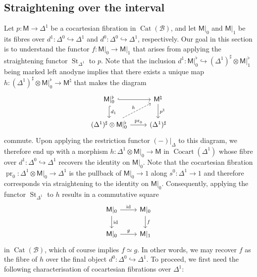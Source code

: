 \documentclass[reqno]{amsart}
\numberwithin{equation}{subsection}
\theoremstyle{plain}
\theoremstyle{definition}
\let\scr=\mathcal
\let\into=\hookrightarrow
\def\BB{\scr B}
\DeclareMathOperator{\id}{id}
\DeclareMathOperator{\Cat}{Cat}
\DeclareMathOperator{\Cocart}{Cocart}
\DeclareMathOperator{\pr}{pr}
\DeclareMathOperator{\St}{St}
\newcommand{\I}[1]{\mathsf{#1}}
\begin{document}
\subsection{Straightening over the interval}
\label{sec:straighteningInterval}
Let $p\colon \I{M}\to\Delta^1$ be a cocartesian fibration in $\Cat(\BB)$, and let $\I{M}\vert_0$ and $\I{M}\vert_1$ be its fibres over $d^1\colon\Delta^0\into\Delta^1$ and $d^0\colon\Delta^0\into\Delta^1$, respectively. Our goal in this section is to understand the functor $f\colon\I{M}\vert_0\to\I{M}\vert_1$ that arises from applying the straightening functor $\St_{\Delta^1}$ to $p$. Note that the inclusion $d^1\colon \I{M}\vert_0^\flat\into(\Delta^1)^\sharp\otimes\I{M}\vert_1^\flat$ being marked left anodyne implies that there exists a unique map $h\colon(\Delta^1)^\sharp\otimes\I{M}\vert_0^\flat\to\I{M}^\natural$ that makes the diagram
\begin{equation*}
\begin{tikzcd}
\I{M}\vert_0^\flat\arrow[r, hookrightarrow]  \arrow[d, "d_1", hookrightarrow]& \I{M}^\natural\arrow[d, "p^\natural"]\\
(\Delta^1)^\sharp\otimes\I{M}\vert_0^\flat\arrow[r, "\pr_0"]\arrow[ur, dashed, "h"]& (\Delta^1)^\sharp 
\end{tikzcd}
\end{equation*}
commute. Upon applying the restriction functor $(-)\vert_{\Delta}$ to this diagram, we therefore end up with a morphism $h\colon \Delta^1\otimes\I{M}\vert_0\to\I{M}$ in $\Cocart(\Delta^1)$ whose fibre over $d^1\colon\Delta^0\into\Delta^1$ recovers the identity on $\I{M}\vert_0$. Note that the cocartesian fibration $\pr_0\colon\Delta^1\otimes\I{M}\vert_0\to\Delta^1$ is the pullback of $\I{M}\vert_0\to 1$ along $s^0\colon\Delta^1\to 1$ and therefore corresponds via straightening to the identity on $\I{M}\vert_0$. Consequently, applying the functor $\St_{\Delta^1}$ to $h$ results in a commutative square
\begin{equation*}
\begin{tikzcd}
	\I{M}\vert_0\arrow[d, "\id"]\arrow[r, "\id"] & \I{M}\vert_0\arrow[d, "f"]\\
	\I{M}\vert_0\arrow[r, "g"] & \I{M}\vert_1
\end{tikzcd}
\end{equation*}
in $\Cat(\BB)$, which of course implies $f\simeq g$. In other words, we may recover $f$ as the fibre of $h$ over the final object $d^0\colon\Delta^0\into\Delta^1$. To proceed, we first need the following characterisation of cocartesian fibrations over $\Delta^1$:
\end{document}
